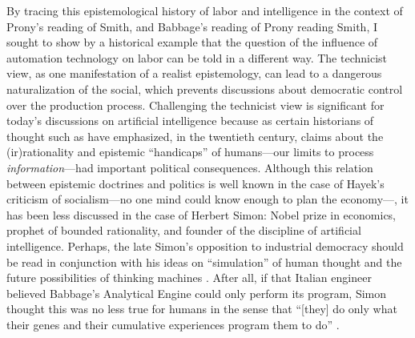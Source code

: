 \documentclass[version=last,draft=false,paper=A4,portrait,twoside=true,twocolumn=false,headinclude=false,footinclude=false,fontsize=12,BCOR=20mm,DIV=calc,pagesize=auto,titlepage=firstiscover,mpinclude=false,open=right,chapterprefix=true,numbers=autoendperiod,headsepline=false,headings=twolinechapter,parskip=false]{scrbook}
\begin{document}
By tracing this epistemological history of labor and intelligence in the
context of Prony's reading of Smith, and Babbage's reading of Prony reading
Smith, I sought to show by a historical example that the question of the
influence of automation technology on labor can be told in a different way.
The technicist view, as one manifestation of a realist epistemology, can
lead to a dangerous naturalization of the social, which prevents
discussions about democratic control over the production process.
Challenging the technicist view is significant for today's discussions on
artificial intelligence because as certain historians of thought such as
\textcite{heyck2012} have emphasized, in the twentieth century, claims about
the (ir)rationality and epistemic ``handicaps'' of humans---our limits to
process \emph{information}---had important political consequences. Although this
relation between epistemic doctrines and politics is well known in the case
of Hayek's criticism of socialism---no one mind could know enough to plan
the economy---, it has been less discussed in the case of Herbert Simon:
Nobel prize in economics, prophet of bounded rationality, and founder of
the discipline of artificial intelligence. Perhaps, the late Simon's
opposition to industrial democracy should be read in conjunction with his
ideas on ``simulation'' of human thought and the future possibilities of
thinking machines \autocite{simon1983b}. After all, if that Italian engineer
believed Babbage's Analytical Engine could only perform its program, Simon
thought this was no less true for humans in the sense that ``[they] do only
what their genes and their cumulative experiences program them to do''
\autocite[45]{simon1960_1985}.



\printbibliography[title=References]
\end{document}
